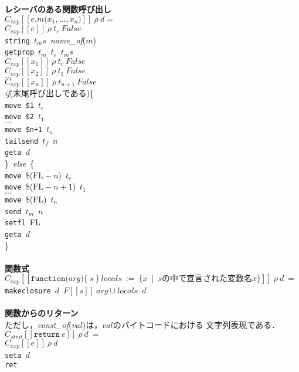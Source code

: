 \documentclass[a4j,12pt]{jarticle}
\begin{document}
{\begin{tabbing}
\textbf{レシーバのある関数呼び出し} \\
\>$C_{exp}[[e.m\texttt{(}x_1, ... , x_n\texttt{)}]]\ \rho\ d=$ \\
\>\>$C_{exp}[[e]]\ \rho\ t_e\ False$ \\
\>\>\texttt{string}\ $t_ms$\ \textit{name\_of}($m$) \\
\>\>\texttt{getprop}\ $t_m$\ $t_e$\ $t_ms$ \\
\>\>$C_{exp}[[x_1]]\ \rho\ t_e\ False$ \\
\>\>$C_{exp}[[x_2]]\ \rho\ t_1\ False$ \\
\>\>$...$ \\
\>\>$C_{exp}[[x_n]]\ \rho\ t_{n+1}\ False$ \\
\>\>\textit{if}(末尾呼び出しである)\{ \\
\>\>\>\texttt{move}\ \texttt{\$1}\ $t_e$ \\
\>\>\>\texttt{move}\ \texttt{\$2}\ $t_1$ \\
\>\>\>$...$ \\
\>\>\>\texttt{move}\ \texttt{\$n+1}\ $t_n$ \\
\>\>\>\texttt{tailsend}\ $t_f$\ $n$ \\
\>\>\>\texttt{geta}\ $d$ \\
\>\>\}\ \textit{else}\ \{ \\
\>\>\>\texttt{move}\ \$($\textrm{FL}-n$)\ $t_e$ \\
\>\>\>\texttt{move}\ \$($\textrm{FL}-n+1$)\ $t_1$ \\
\>\>\>$...$ \\
\>\>\>\texttt{move}\ \$(FL)\ $t_n$ \\
\>\>\>\texttt{send}\ $t_m$\ $n$ \\
\>\>\>\texttt{setfl}\ FL \\
\>\>\>\texttt{geta}\ $d$ \\
\>\>\} \\
\\

\textbf{関数式} \\
\>$C_{exp}[[\texttt{function(}arg\texttt{)\{}\ s\ \texttt{\}}\ 
  locals\ :=\ \{x\ \mid\ sの中で宣言された変数名x\}]]\ \rho\ d\ =$ \\
\>\>\texttt{makeclosure}\ $d$\ $F[[s]]\ arg\cup locals$\ $d$ \\
\\

\textbf{関数からのリターン} \\
ただし，\textit{const\_of}($val$)は，$val$のバイトコードにおける
文字列表現である．\\
\>$ C_{stmt}[[\texttt{return}\ e]]\ \rho\ d\ =$ \\
\>\>$C_{exp}[[e]]\ \rho\ d $ \\
\>\>\texttt{seta}\ $d$ \\
\>\>\texttt{ret} \\

\end{tabbing}
}
\end{document}
